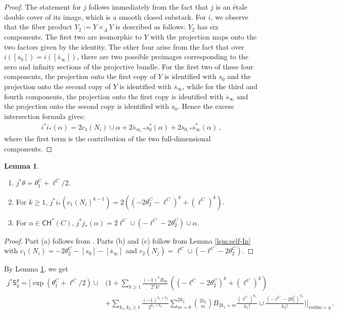 \documentclass[11pt]{article}
\def\CH{\mathsf{CH}}
\def\codim{\mathrm{codim}}
\newcommand{\barA}{\overline{A}}
\newcommand{\sfS}{\mathsf{S}}
\newcommand{\sbar}{\overline{s}}
\theoremstyle{definition}
\newtheorem{lemma}[definition]{Lemma}
\begin{document}
\begin{proof}
	The statement for $j$ follows immediately from the fact that $j$ is an \'etale double cover of its image, which is a smooth closed substack.
	For $i$, we observe that the fiber product $Y_2:=Y\times_{\barA}Y$ is described as follows: $Y_2$ has six components. The first
	two are isomorphic to $Y$ with the projection maps onto the two factors given by the identity. The other four arise from the fact that
	over $i([s_0])=i([\sbar_{\infty }])$, there are two possible preimages corresponding to the zero and infinity sections of the projective
	bundle. For the first two of these four components, the projection onto the first copy of $Y$ is identified with $s_0$ and the projection onto the second
	copy of $Y$ is identified with $\sbar_{\infty }$, while for the third and fourth components, the projection onto the first copy is identified
	with $\sbar_{\infty }$ and the projection onto the second copy is identified with $s_0$. Hence the excess intersection formula gives:
\begin{align*}
	i^{\ast}i_{\ast}(\alpha)=2c_1(N_i)\cup \alpha+2\overline{s}_{\infty,\ast}s_0^{\ast}(\alpha)+2s_{0,\ast}\overline{s}_{\infty}^{\ast}(\alpha)\,,
\end{align*}
	where the first term is the contribution of the two full-dimensional components.
\end{proof}

\begin{lemma}\label{lem:jstar}
    \begin{enumerate}[label=(\alph*)]
        \item $j^*\theta = \theta_1^C + \ell^C/2$.
        \item For $k\geq 1$, $j^*i_*(c_1(N_i)^{k-1}) = 2((-2\theta_2^C-\ell^C)^k + (\ell^C)^k)$.
		\item For $\alpha \in \CH^*(C)$, $j^*j_*(\alpha) = 2 \ell^C \cup (-\ell^C -2\theta_2^C) \cup \alpha$.
    \end{enumerate}
\end{lemma}
\begin{proof}
    Part (a) follows from \cite[Corollary 4.6]{EGH10}.
    Parts (b) and (c) follow from Lemma \ref{lem:self-In} with
    $c_1(N_i)= -2\theta_2^C - [s_0] - [\sbar_\infty]$
    and $c_2(N_j) = \ell^C\cup (-\ell^C - 2\theta^C_2)$.
\end{proof}
By Lemma \ref{lem:jstar}, we get
\begin{align}
    j^*\sfS^g_g
=
\Bigg[
\exp(\theta_1^C+ \ell^C/2) \cup
&\Bigg(
1
+
 \sum_{k\ge 1}
\frac{(-1)^k B_{2k}}{2^k k!}
\,\left((-\ell^C -2\theta_2^C)^k + (\ell^C)^k\right)\label{eq:jS} \\[4pt]
&+
\sum_{k_1,k_2\ge 1}
\frac{(-1)^{k_1+k_2}}{2^{k_1+k_2}}
\sum_{m=0}^{2k_2}
\binom{2k_2}{m}
B_{2k_1+m}
\frac{(\ell^C)^{k_1}}{k_1!}
\cup
\frac{(-\ell^C-2\theta_2^C)^{k_2}}{k_2!}
\Bigg)
\Bigg]_{\codim = g}\,.\nonumber
\end{align}
\end{document}
